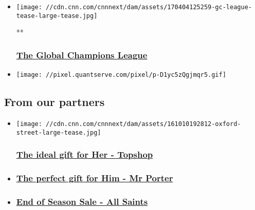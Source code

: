 \begin{itemize}
\item
  \href{/videos/sports/2017/04/04/global-champions-league-show-jumping-horses-cnn-equestrian-orig.cnn}{}

  \texttt{[image: //cdn.cnn.com/cnnnext/dam/assets/170404125259-gc-league-tease-large-tease.jpg]}

  **

  \hypertarget{the-global-champions-league}{%
  \subsubsection{\texorpdfstring{\href{/videos/sports/2017/04/04/global-champions-league-show-jumping-horses-cnn-equestrian-orig.cnn}{The
  Global Champions
  League}}{The Global Champions League}}\label{the-global-champions-league}}
\end{itemize}

\begin{itemize}
\item
  \texttt{[image: //pixel.quantserve.com/pixel/p-D1yc5zQgjmqr5.gif]}
\end{itemize}

\hypertarget{from-our-partners-}{%
\subsection{From our partners~}\label{from-our-partners-}}

\begin{itemize}
\item
  \href{http://topshop.com/}{}

  \texttt{[image: //cdn.cnn.com/cnnnext/dam/assets/161010192812-oxford-street-large-tease.jpg]}

  \hypertarget{the-ideal-gift-for-her---topshop}{%
  \subsubsection{\texorpdfstring{\href{http://topshop.com/}{The ideal
  gift for Her -
  Topshop}}{The ideal gift for Her - Topshop}}\label{the-ideal-gift-for-her---topshop}}
\item
  \hypertarget{the-perfect-gift-for-him---mr-porter}{%
  \subsubsection{\texorpdfstring{\href{http://mrporter.com/}{The perfect
  gift for Him - Mr
  Porter}}{The perfect gift for Him - Mr Porter}}\label{the-perfect-gift-for-him---mr-porter}}
\item
  \hypertarget{end-of-season-sale---all-saints}{%
  \subsubsection{\texorpdfstring{\href{http://us.allsaints.com/}{End of
  Season Sale - All
  Saints}}{End of Season Sale - All Saints}}\label{end-of-season-sale---all-saints}}
\end{itemize}

